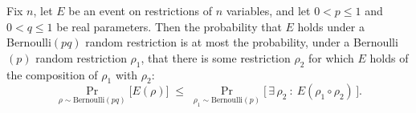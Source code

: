 \begin{theorem}
\label{LMN.restriction_compose_le}
\leanok
{}
Fix $n$, let $E$ be an event on restrictions of $n$ variables, and let $0 < p \le 1$ and
$0 < q \le 1$ be real parameters. Then the probability that $E$ holds under a
Bernoulli$(pq)$ random restriction is at most the probability, under a Bernoulli$(p)$
random restriction $\rho_1$, that there is some restriction $\rho_2$ for which $E$ holds
of the composition of $\rho_1$ with $\rho_2$:
\[
  \Pr_{\rho \sim \mathrm{Bernoulli}(pq)}\bigl[E(\rho)\bigr]
  \;\le\;
\Pr_{\rho_1 \sim \mathrm{Bernoulli}(p)}\bigl[\,\exists\,\rho_2\ :\ E(\rho_1 \circ
\rho_2)\,\bigr].
\]
\end{theorem}
